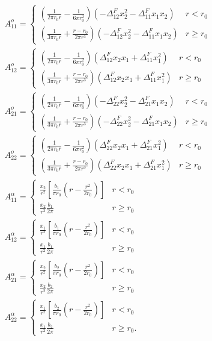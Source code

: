 \documentclass[11pt,letterpaper]{article}
\begin{document}
\begin{eqnarray*}
&A^o_{11}  = 
\begin{cases}
 \left( \frac{1}{2\pi r_0 r}- \frac{1}{6 \pi r_0^2} \right) \left(-\Delta^F_{12} x_2^2-\Delta^F_{11} x_1 x_2 \right) &r < r_0 \\
\left( \frac{1}{3\pi r_0 r}+\frac{r-r_0}{2\pi r^3} \right) \left( -\Delta^F_{12} x_2^2 - \Delta^F_{11} x_1 x_2 \right) & r \ge r_0
\end{cases}
\\
&A^o_{12}  = 
\begin{cases}
 \left( \frac{1}{2\pi r_0 r}- \frac{1}{6 \pi r_0^2} \right) \left( \Delta^F_{12} x_2 x_1 + \Delta^ F_{11} x_1^2 \right) &r < r_0 \\
\left( \frac{1}{3\pi r_0 r}+\frac{r-r_0}{2\pi r^3} \right) \left( \Delta^ F_{12} x_2 x_1 + \Delta^ F_{11} x_1^2 \right) & r \ge r_0
\end{cases}
\\
&A^o_{21}  = 
\begin{cases}
\left( \frac{1}{2\pi r_0 r}- \frac{1}{6 \pi r_0^2} \right)\left( -\Delta ^F_{22} x_2^2-\Delta^ F_{21} x_1 x_2 \right) &r < r_0 \\
\left( \frac{1}{3\pi r_0 r}+\frac{r-r_0}{2\pi r^3} \right) \left(-\Delta^ F_{22} x_2^2 - \Delta^ F_{21} x_1 x_2 \right) & r \ge r_0
\end{cases}
\\
&A^o_{22}  = 
\begin{cases}
 \left( \frac{1}{2\pi r_0 r}- \frac{1}{6 \pi r_0^2} \right) \left( \Delta^ F_{22} x_2 x_1 + \Delta^ F_{21} x_1^2 \right) &r < r_0 \\
\left( \frac{1}{3\pi r_0 r}+\frac{r-r_0}{2\pi r^3} \right) \left(\Delta^ F_{22} x_2 x_1+ \Delta^ F_{21} x_1^2 \right) & r \ge r_0
\end{cases}
\\&
A^{\alpha}_{11}  = 
\begin{cases}
 \frac{x_2}{r^2}\left[\frac{b_1}{\pi r_0}\left(r-\frac{r^2}{2r_0}\right)\right] &r < r_0 \\
\frac{x_2}{r^2}\frac{b_1}{2\pi} & r \ge r_0
\end{cases}
\\
&A^{\alpha}_{12}  = 
\begin{cases}
\frac{x_1}{r^2}\left[\frac{b_1}{\pi r_0}\left(r-\frac{r^2}{2r_0}\right)\right]  &r < r_0 \\
\frac{x_1}{r^2}\frac{b_1}{2\pi} & r \ge r_0
\end{cases}
\\
&A^{\alpha}_{21}  = 
\begin{cases}
 \frac{x_2}{r^2}\left[\frac{b_2}{\pi r_0}\left(r-\frac{r^2}{2r_0}\right)\right] &r < r_0 \\
 \frac{x_2}{r^2}\frac{b_2}{2\pi} & r \ge r_0
\end{cases}
\\
&A^{\alpha}_{22}  = 
\begin{cases}
\frac{x_1}{r^2}\left[\frac{b_2}{\pi r_0}\left(r-\frac{r^2}{2r_0}\right)\right] &r < r_0 \\
 \frac{x_1}{r^2}\frac{b_2}{2\pi} & r \ge r_0.
 \end{cases}
\end{eqnarray*}
\end{document}
